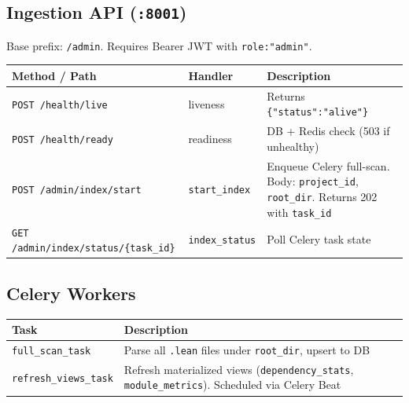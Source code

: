 \subsection{Ingestion API (\texttt{:8001})}

Base prefix: \texttt{/admin}.  Requires Bearer JWT with \texttt{role:"admin"}.

\begin{longtable}{@{}llp{5.5cm}@{}}
\toprule
\textbf{Method / Path} & \textbf{Handler} & \textbf{Description} \\
\midrule
\endfirsthead
\bottomrule
\endfoot
\texttt{POST /health/live}
  & liveness & Returns \texttt{\{"status":"alive"\}} \\
\texttt{POST /health/ready}
  & readiness & DB + Redis check (503 if unhealthy) \\
\texttt{POST /admin/index/start}
  & \texttt{start\_index} & Enqueue Celery full-scan.  Body: \texttt{project\_id}, \texttt{root\_dir}.  Returns 202 with \texttt{task\_id} \\
\texttt{GET /admin/index/status/\{task\_id\}}
  & \texttt{index\_status} & Poll Celery task state \\
\end{longtable}

\subsection{Celery Workers}

\begin{longtable}{@{}lp{7cm}@{}}
\toprule
\textbf{Task} & \textbf{Description} \\
\midrule
\endfirsthead
\bottomrule
\endfoot
\texttt{full\_scan\_task}
  & Parse all \texttt{.lean} files under \texttt{root\_dir}, upsert to DB \\
\texttt{refresh\_views\_task}
  & Refresh materialized views (\texttt{dependency\_stats}, \texttt{module\_metrics}).  Scheduled via Celery Beat \\
\end{longtable}
